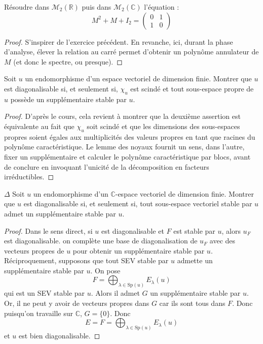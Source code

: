 \documentclass[french,a4paper]{article}
\newcommand{\R}{\mathbb{R}}
\newcommand{\C}{\mathbb{C}}
\theoremstyle{plain}
\theoremstyle{definition}
\theoremstyle{remark}
\begin{document}
\begin{ex}{}
	Résoudre dans $\mathcal{M}_2(\R)$ puis dans $\mathcal{M}_2(\C)$ l'équation :
	$$M^2+M+I_2=\begin{pmatrix}
		0&1\\
		1&0
	\end{pmatrix}$$
\end{ex}
\begin{proof}
	S'inspirer de l'exercice précédent. En revanche, ici, durant la phase d'analyse, élever la relation au carré permet d'obtenir un polynôme annulateur de $M$ (et donc le spectre, ou presque).
\end{proof}

\begin{ex}{}
	Soit $u$ un endomorphisme d'un espace vectoriel de dimension finie. Montrer que $u$ est diagonalisable si, et seulement si, $\chi_u$ est scindé et tout sous-espace propre de $u$ possède un supplémentaire stable par $u$.
\end{ex}
\begin{proof}
	D'après le cours, cela revient à montrer que la deuxième assertion est équivalente au fait que $\chi_u$ soit scindé et que les dimensions des sous-espaces propres soient égales aux multiplicités des valeurs propres en tant que racines du polynôme caractéristique. Le lemme des noyaux fournit un sens, dans l'autre, fixer un supplémentaire et calculer le polynôme caractéristique par blocs, avant de conclure en invoquant l'unicité de la décomposition en facteurs irréductibles.
\end{proof}

\begin{ex}{$\Delta$}
	Soit $u$ un endomorphisme d'un $\C$-espace vectoriel de dimension finie. Montrer que $u$ est diagonalisable si, et seulement si, tout sous-espace vectoriel stable par $u$ admet un supplémentaire stable par $u$.
\end{ex}
\begin{proof}
	Dans le sens direct, si $u$ est diagonalisable et $F$ est stable par $u$, alors $u_F$ est diagonalisable. on complète une base de diagonalisation de $u_F$ avec des vecteurs propres de $u$ pour obtenir un supplémentaire stable par $u$. Réciproquement, supposons que tout SEV stable par $u$ admette un supplémentaire stable par $u$. On pose $$F=\bigoplus_{\lambda\in \text{Sp}(u)}E_\lambda(u)$$ qui est un SEV stable par $u$. Alors il admet $G$ un supplémentaire stable par $u$. Or, il ne peut y avoir de vecteurs propres dans $G$ car ils sont tous dans $F$. Donc puisqu'on travaille sur $\C$, $G=\{0\}$. Donc $$E=F=\bigoplus_{\lambda\in \text{Sp}(u)}E_\lambda(u)$$ et $u$ est bien diagonalisable.
\end{proof}
\end{document}
